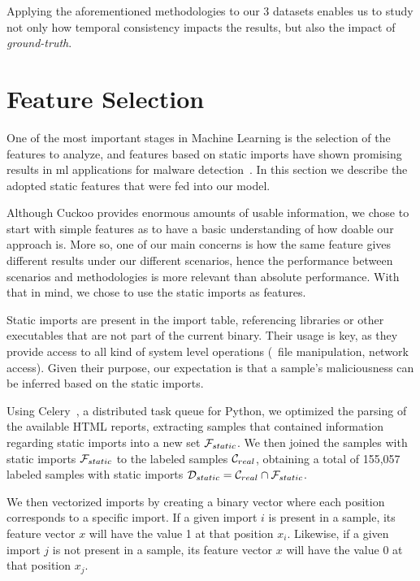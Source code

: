 Applying the aforementioned methodologies to our 3 datasets enables us to study not only how temporal consistency impacts the results, but also the impact of \textit{ground-truth}.

\section{Feature Selection}
\label{section:feature_selection}

One of the most important stages in Machine Learning is the selection of the features to analyze, and features based on static imports have shown promising results in \gls{ml} applications for malware detection~\cite{miller:rev_int,schultz:data_mining}.
In this section we describe the adopted static features that were fed into our model.

Although Cuckoo provides enormous amounts of usable information, we chose to start with simple features as to have a basic understanding of how doable our approach is.
More so, one of our main concerns is how the same feature gives different results under our different scenarios, hence the performance between scenarios and methodologies is more relevant than absolute performance.
With that in mind, we chose to use the static imports as features.

Static imports are present in the import table, referencing libraries or other executables that are not part of the current binary.
Their usage is key, as they provide access to all kind of system level operations (\eg\ file manipulation, network access). Given their purpose, our expectation is that a sample's maliciousness can be inferred based on the static imports.

Using Celery~\cite{tool:celery}, a distributed task queue for Python, we optimized the parsing of the available HTML reports, extracting samples that contained information regarding static imports into a new set $\mathcal{F}_{static}$.
We then joined the samples with static imports $\mathcal{F}_{static}$ to the labeled samples $\mathcal{C}_{real}$, obtaining a total of 155,057 labeled samples with static imports $\mathcal{D}_{static} = \mathcal{C}_{real} \cap \mathcal{F}_{static}$.

We then vectorized imports by creating a binary vector where each position corresponds to a specific import.
If a given import $i$ is present in a sample, its feature vector $x$ will have the value 1 at that position $x_i$.
Likewise, if a given import $j$ is not present in a sample, its feature vector $x$ will have the value 0 at that position $x_j$.

